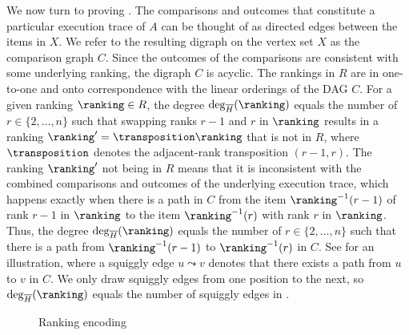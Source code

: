 We now turn to proving . The comparisons and outcomes that constitute a particular execution trace of $A$ can be thought of as directed edges between the items in $X$. We refer to the resulting digraph on the vertex set $X$ as the comparison graph $C$. Since the outcomes of the comparisons are consistent with some underlying ranking, the digraph $C$ is acyclic. The rankings in $R$ are in one-to-one and onto correspondence with the linear orderings of the DAG $C$. For a given ranking $\ranking \in R$, the degree $\deg_{\overline{H}}(\ranking)$ equals the number of $r \in \{2,\dots,n\}$ such that swapping ranks $r-1$ and $r$ in $\ranking$ results in a ranking $\ranking' = \transposition \ranking$ that is not in $R$, where $\transposition$ denotes the adjacent-rank transposition $(r-1,r)$. The ranking $\ranking'$ not being in $R$ means that it is inconsistent with the combined comparisons and outcomes of the underlying execution trace, which happens exactly when there is a path in $C$ from the item $\ranking^{-1}(r-1)$ of rank $r-1$ in $\ranking$ to the item $\ranking^{-1}(r)$ with rank $r$ in $\ranking$. Thus, the degree $\deg_{\overline{H}}(\ranking)$ equals the number of $r \in \{2,\dots,n\}$ such that there is a path from $\ranking^{-1}(r-1)$ to $\ranking^{-1}(r)$ in $C$. See  for an illustration, where a squiggly edge $u \leadsto v$ denotes that there exists a path from $u$ to $v$ in $C$. We only draw squiggly edges from one position to the next, so $\deg_{\overline{H}}(\ranking)$ equals the number of squiggly edges in . 

\begin{figure}[ht]
    \centering
\caption{Ranking encoding}\label{fig:encoding}
\end{figure}

